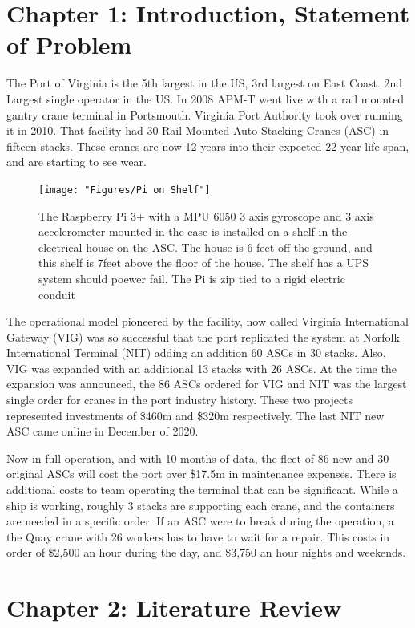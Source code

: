 \documentclass[journal=jacsat,manuscript=article]{achemso}
\begin{document}
\section{Chapter 1: Introduction, Statement of Problem}
The Port of Virginia is the 5th largest in the US, 3rd largest on East Coast. 2nd Largest single operator in the US. In 2008 APM-T went live with a rail mounted gantry crane terminal in Portsmouth. Virginia Port Authority took over running it in 2010. That facility had 30 Rail Mounted Auto Stacking Cranes (ASC) in fifteen stacks. These cranes are now 12 years into their expected 22 year life span, and are starting to see wear. 
\begin{figure}
	\centering
	\texttt{[image: "Figures/Pi on Shelf"]}
	\caption[Sensor on a Shelf in the ASC House]{The Raspberry Pi 3+ with a MPU 6050 3 axis gyroscope and 3 axis accelerometer mounted in the case is installed on a shelf in the electrical house on the ASC.  The house is 6 feet off the ground, and this shelf is 7feet above the floor of the house.  The shelf has a UPS system should poewer fail.  The Pi is zip tied to a rigid electric conduit}
	\label{fig:mounted_pi}
\end{figure}
The operational model pioneered by the facility, now called Virginia International Gateway (VIG) was so successful that the port replicated the system at Norfolk International Terminal (NIT) adding an addition 60 ASCs in 30 stacks. Also, VIG was expanded with an additional 13 stacks with 26 ASCs. At the time the expansion was announced, the 86 ASCs ordered for VIG and NIT was the largest single order for cranes in the port industry history. These two projects represented investments of \$460m and \$320m respectively.  The last NIT new ASC came online in December of 2020. 

Now in full operation, and with 10 months of data, the fleet of 86 new and 30 original ASCs will cost the port over \$17.5m in maintenance expenses. There is additional costs to team operating the terminal that can be significant. While a ship is working, roughly 3 stacks are supporting each crane, and the containers are needed in a specific order. If an ASC were to break during the operation, a the Quay crane with 26 workers has to have to wait for a repair. This costs in order of \$2,500 an hour during the day, and \$3,750 an hour nights and weekends.


\pagebreak
\section{Chapter 2: Literature Review}
\end{document}
